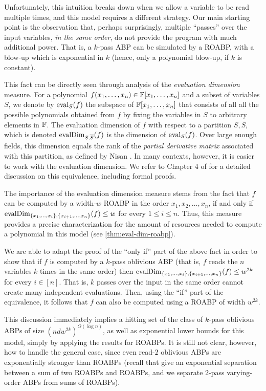 \documentclass[11pt]{article}
\begin{document}
Unfortunately, this intuition breaks down when we allow a variable to be read multiple times, and this model requires a different strategy. Our main starting point is the observation that, perhaps surprisingly, multiple ``passes'' over the input variables, {\em in the same order}, do not provide the program with much additional power. That is, a $k$-pass ABP can be simulated by a ROABP, with a blow-up which is exponential in $k$ (hence, only a polynomial blow-up, if $k$ is constant).

This fact can be directly seen through analysis of the {\em evaluation dimension} measure. For a polynomial $f(x_1, \ldots, x_n) \in \F[x_1, \ldots, x_n]$ and a subset of variables $S$, we denote by $\operatorname{eval}_S(f)$ the subspace of $\F[x_1, \ldots, x_n]$ that consists of all all the possible polynomials obtained from $f$ by fixing the variables in $S$ to arbitrary elements in $\F$. The evaluation dimension of $f$ with respect to a partition $S, \overline{S}$, which is denoted $\operatorname{evalDim}_{S, \overline{S}}(f)$ is the dimension of $\operatorname{eval}_S(f)$. Over large enough fields, this dimension equals the rank of the {\em partial derivative matrix} associated with this partition, as defined by Nisan \cite{nis91}. In many contexts, however, it is easier to work with the evaluation dimension. We refer to Chapter 4 of \cite{forbesphdthesis} for a detailed discussion on this equivalence, including formal proofs.


The importance of the evaluation dimension measure stems from the fact that $f$ can be computed by a width-$w$ ROABP in the order $x_1, x_2, \ldots, x_n$, if and only if $\operatorname{evalDim}_{\left\{ x_1, \ldots, x_i \right\}, \left\{ x_{i+1}, \ldots, x_n \right\}}(f) \le w$ for every $1 \le i \le n$. Thus, this measure provides a precise characterization for the amount of resources needed to compute a polynomial in this model (see \autoref{thm:eval-dim-roabp}).

\medskip

We are able to adapt the proof of the ``only if'' part of the above fact in order to show that if $f$ is computed by a $k$-pass oblivious ABP (that is, $f$ reads the $n$ variables $k$ times in the same order) then $\operatorname{evalDim}_{\left\{ x_1, \ldots, x_i \right\}, \left\{ x_{i+1}, \ldots, x_n \right\}}(f) \le w^{2k}$ for every $i \in [n]$. That is, $k$ passes over the input in the same order cannot create many independent evaluations. Then, using the ``if'' part of the equivalence, it follows that $f$ can also be computed using a ROABP of width $w^{2k}$. 

This discussion immediately implies a hitting set of the class of $k$-pass oblivious ABPs of size $(ndw^{2k})^{O(\log n)}$, as well as exponential lower bounds for this model, simply by applying the results for ROABPs. It is still not clear, however, how to handle the general case, since even read-$2$ oblivious ABPs are exponentially stronger than ROABPs (recall that \cite{KNS15} give an exponential separation between a sum of two ROABPs and ROABPs, and we separate $2$-pass varying-order ABPs from sums of ROABPs).
\end{document}
